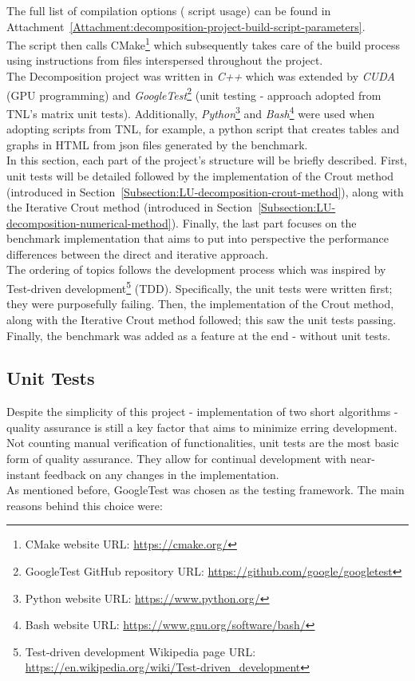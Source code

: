 The full list of compilation options ( script usage) can be found in Attachment~\ref{Attachment:decomposition-project-build-script-parameters}. \\
The  script then calls CMake\footnote{CMake website URL: \url{https://cmake.org/}} which subsequently takes care of the build process using instructions from  files interspersed throughout the project. \\
The Decomposition project was written in \textit{C++} which was extended by \textit{CUDA} (GPU programming) and \textit{GoogleTest}\footnote{\label{Footnote:google-test}GoogleTest GitHub repository URL: \url{https://github.com/google/googletest}} (unit testing - approach adopted from TNL's matrix unit tests). Additionally, \textit{Python}\footnote{Python website URL: \url{https://www.python.org/}} and \textit{Bash}\footnote{Bash website URL: \url{https://www.gnu.org/software/bash/}} were used when adopting scripts from TNL, for example, a python script that creates tables and graphs in HTML from json files generated by the benchmark. \\
In this section, each part of the project's structure will be briefly described. First, unit tests will be detailed followed by the implementation of the Crout method (introduced in Section~\ref{Subsection:LU-decomposition-crout-method}), along with the Iterative Crout method (introduced in Section~\ref{Subsection:LU-decomposition-numerical-method}). Finally, the last part focuses on the benchmark implementation that aims to put into perspective the performance differences between the direct and iterative approach. \\
The ordering of topics follows the development process which was inspired by Test-driven development\footnote{Test-driven development Wikipedia page URL: \url{https://en.wikipedia.org/wiki/Test-driven_development}} (TDD). Specifically, the unit tests were written first; they were purposefully failing. Then, the implementation of the Crout method, along with the Iterative Crout method followed; this saw the unit tests passing. Finally, the benchmark was added as a feature at the end - without unit tests.

\subsection{Unit Tests \TO}
Despite the simplicity of this project - implementation of two short algorithms - quality assurance is still a key factor that aims to minimize erring development. Not counting manual verification of functionalities, unit tests are the most basic form of quality assurance. They allow for continual development with near-instant feedback on any changes in the implementation. \\
As mentioned before, GoogleTest was chosen as the testing framework. The main reasons behind this choice were:

